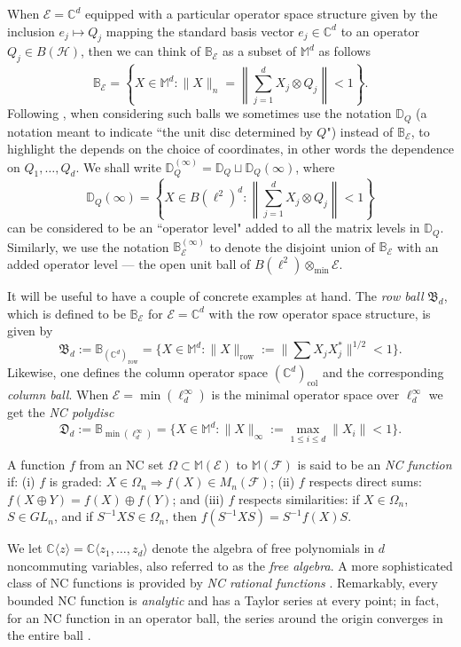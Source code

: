 \documentclass[12pt]{amsart}
\numberwithin{equation}{section}
\theoremstyle{definition}
\newcommand{\cE}{\mathcal{E}}
\newcommand{\cF}{\mathcal{F}}
\newcommand{\cH}{\mathcal{H}}
\newcommand{\bB}{\mathbb{B}}
\newcommand{\bC}{\mathbb{C}}
\newcommand{\bD}{\mathbb{D}}
\newcommand{\bM}{\mathbb{M}}
\newcommand{\fB}{{\mathfrak{B}}}
\newcommand{\fD}{{\mathfrak{D}}}
\begin{document}
When $\cE = \bC^d$ equipped with a particular operator space structure given by the inclusion $e_j \mapsto Q_j$ mapping the standard basis vector $e_j \in \bC^d$ to an operator $Q_j \in B(\cH)$, then we can think of $\bB_\cE$ as a subset of $\bM^d$ as follows
\[
\bB_\cE = \left\{X \in \bM^d : \|X\|_n = \left\|\sum_{j=1}^d X_j \otimes Q_j  \right\| < 1\right\} .
\]
Following \cite{BMV-ncrkhs,BMV-int,SampatShalit25,sampat2025weak}, when considering such balls we sometimes use the notation $\bD_Q$ (a notation meant to indicate ``the unit disc determined by $Q$") instead of $\bB_\cE$, to highlight the depends on the choice of coordinates, in other words the dependence on $Q_1, \ldots, Q_d$. 
We shall write $\bD_Q^{(\infty)} = \bD_Q \sqcup \bD_Q(\infty)$, where 
\[
\bD_Q(\infty) = \left\{X \in B(\ell^2)^d : \left\|\sum_{j=1}^d X_j \otimes Q_j \right\| < 1 \right\}
\]
can be considered to be an ``operator level" added to all the matrix levels in $\bD_Q$. 
Similarly, we use the notation $\bB_\cE^{(\infty)}$ to denote the disjoint union of $\bB_\cE$ with an added operator level --- the open unit ball of $B(\ell^2) \otimes_{\min} \cE$. 


It will be useful to have a couple of concrete examples at hand. 
The {\em row ball} $\fB_d$, which is defined to be $\bB_\cE$ for $\cE=\bC^d$ with the row operator space structure, is given by
\begin{equation}\label{eq:Ball}
\fB_d := \bB_{(\bC^d)_{\operatorname{row}}} = \{ X \in \bM^d : \|X\|_{\operatorname{row}} := \|\sum X_j X_j^*\|^{1/2} < 1\} .
\end{equation}
Likewise, one defines the column operator space $(\bC^d)_{\operatorname{col}}$ and the corresponding {\em column ball}. 
When $\cE = \min(\ell^\infty_d)$ is the minimal operator space over $\ell^\infty_d$ we get the {\em NC polydisc}
\[
\fD_d := \bB_{\min(\ell^\infty_d)} = \{X \in \bM^d : \|X\|_\infty := \max_{1 \leq i \leq d} \|X_i\| < 1\}. 
\]

A function $f$ from an NC set $\Omega \subset \bM(\cE)$ to $\mathbb{M}(\cF)$ is said to be an {\em NC function} if: (i) $f$ is graded: $X \in \Omega_n \Rightarrow f(X) \in M_n(\cF)$; (ii) $f$ respects direct sums: $f(X \oplus Y) = f(X) \oplus f(Y)$; and (iii) $f$ respects similarities: if $X \in \Omega_n$, $S \in GL_n$, and if $S^{-1} X S \in \Omega_n$, then $f(S^{-1} X S) = S^{-1} f(X) S$. 

We let $\bC\langle z \rangle = \bC \langle z_1, \ldots, z_d \rangle$ denote the algebra of free polynomials in $d$ noncommuting variables, also referred to as the {\em free algebra}. 
A more sophisticated class of NC functions is provided by {\em NC rational functions} \cite{helton2018applications,JMS-rat,KVV-rat,mai2018free,Volcic}. 
Remarkably, every bounded NC function is {\em analytic} and has a Taylor series at every point; in fact, for an NC function in an operator ball, the series around the origin converges in the entire ball \cite{KVV}. 
\end{document}
